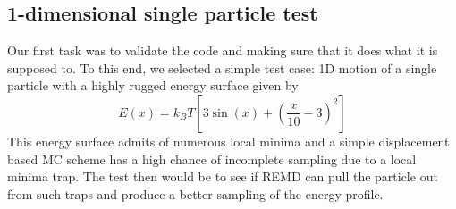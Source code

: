 \documentclass[12pt,letterpaper]{article}
\begin{document}
\subsection*{1-dimensional single particle test}
\noindent Our first task was to validate the code and making sure that it does what it is supposed to. To this end, we selected a simple test case: 1D motion of a single particle with a highly rugged energy surface given by\cite{rblog}
%
\begin{equation}
E(x) = k_B T \left[ 3 \sin(x) + \left( \frac{x}{10} - 3 \right) ^2 \right]
\end{equation}
%
This energy surface admits of numerous local minima and a simple displacement based MC scheme has a high chance of incomplete sampling due to a local minima trap. The test then would be to see if REMD can pull the particle out from such traps and produce a better sampling of the energy profile.
%
\end{document}
